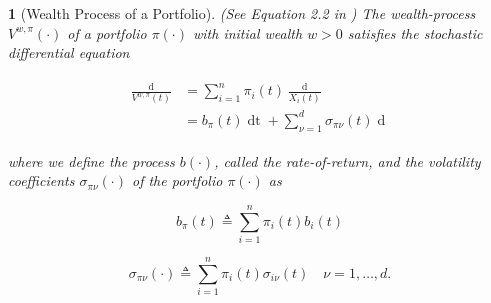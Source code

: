 \documentclass[british]{amsart} \usepackage{lmodern}
\numberwithin{equation}{section} \numberwithin{figure}{section}
\theoremstyle{plain} \newtheorem{thm}{\protect\theoremname}[section]
\theoremstyle{definition} \newtheorem{defn}[thm]{\protect\definitionname}
\theoremstyle{plain} \newtheorem{assumption}[thm]{\protect\assumptionname}
\theoremstyle{plain} \newtheorem{lem}[thm]{\protect\lemmaname}
\theoremstyle{plain} \newtheorem{prop}[thm]{\protect\propositionname}
\theoremstyle{remark} \newtheorem{rem}[thm]{\protect\remarkname}
\theoremstyle{plain} \newtheorem{cor}[thm]{\protect\corollaryname}
\renewcommand{\d}[1]{\mathop{\mathrm{d}{#1}}}
\newcommand{\defeq}{\mathop{\triangleq}} \newcommand{\almostsurely}{\text{a.s.}}
\begin{document}
\begin{prop} [Wealth Process of a Portfolio]
  (See Equation 2.2 in \cite{fernholz2009})
  The wealth-process $V^{w,\pi}(\cdot)$ of a portfolio $\pi(\cdot)$
  with initial wealth $w > 0$ satisfies the stochastic differential equation

  \begin{gather}
    \label{eq:arithmeticreturnofportfolio}
    \begin{split}
      \frac{\d{V^{w,\pi}(t)}}{V^{w,\pi}(t)} 
        &= \sum_{i=1}^{n} \pi_{i}(t) \frac{\d{X_{i}(t)}}{X_{i}(t)} \\
        &= b_{\pi}(t)\d{t} + \sum_{\nu=1}^{d} \sigma_{\pi\nu}(t) \d{W_{\nu}(t)}
    \end{split}
  \end{gather}

  where we define the process $b(\cdot)$, called the \textit{rate-of-return}, and the
  volatility coefficients $\sigma_{\pi\nu}(\cdot)$ of the portfolio $\pi(\cdot)$ 
  as

  \begin{equation}
    \label{eq:wealthprocessrateofreturn}
    b_{\pi}(t) \defeq \sum_{i=1}^{n} \pi_{i}(t) b_{i}(t)
  \end{equation}

  \begin{equation}
    \label{eq:wealthprocessvolatility}
    \sigma_{\pi\nu}(\cdot) \defeq \sum_{i=1}^{n} \pi_{i}(t) \sigma_{i\nu}(t)
    \quad \nu=1,\dots,d.
  \end{equation}

\end{prop}
\end{document}

